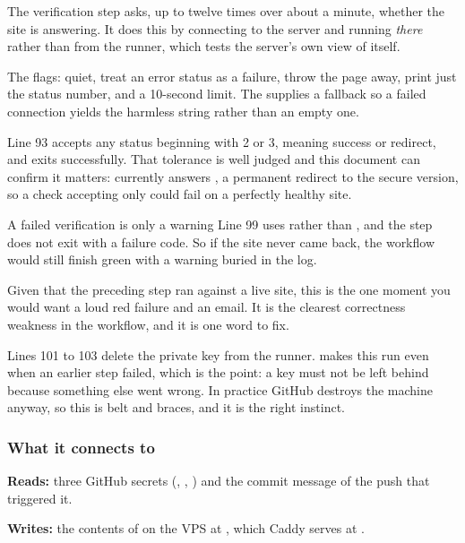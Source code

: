 The verification step asks, up to twelve times over about a minute, whether the site
is answering. It does this by connecting to the server and running 
\emph{there} rather than from the runner, which tests the server's own view of
itself.

The  flags:  quiet,  treat an error status as a
failure,  throw the page away,
 print just the status number, and a 10-second limit.
The  supplies a fallback so a failed connection yields the harmless
string  rather than an empty one.

Line 93 accepts any status beginning with 2 or 3, meaning success or redirect, and
exits successfully. That tolerance is well judged and this document can confirm it
matters:  currently answers , a permanent
redirect to the secure version, so a check accepting only  could fail on a
perfectly healthy site.

\begin{honest}{A failed verification is only a warning}
Line 99 uses  rather than , and the step does not
exit with a failure code. So if the site never came back, the workflow would still
finish green with a warning buried in the log.

Given that the preceding step ran  against a live site, this is
the one moment you would want a loud red failure and an email. It is the clearest
correctness weakness in the workflow, and it is one word to fix.
\end{honest}

Lines 101 to 103 delete the private key from the runner.  makes
this run even when an earlier step failed, which is the point: a key must not be left
behind because something else went wrong. In practice GitHub destroys the machine
anyway, so this is belt and braces, and it is the right instinct.

\subsubsection*{What it connects to}

\textbf{Reads:} three GitHub secrets (, ,
) and the commit message of the push that triggered it.

\textbf{Writes:} the contents of  on the VPS at
, which Caddy serves at .

